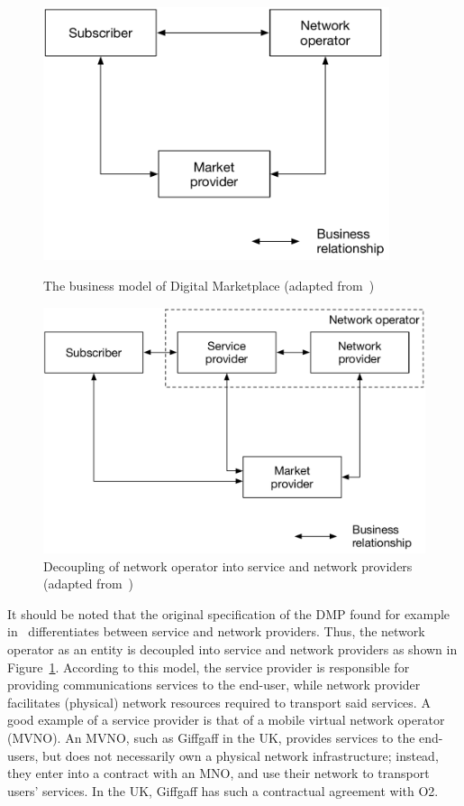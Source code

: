 \begin{figure}[p]
	\includegraphics[width=4in]{DMP/Figures/dmp_model}
	\caption{The business model of Digital Marketplace (adapted from~\cite{DMIrvine02})}
	\label{fig:dmp_model_dmp}
	\vspace{10mm}
	\includegraphics[width=5in]{DMP/Figures/no_decoupled}
	\caption{Decoupling of network operator into service and network providers (adapted from~\cite{DMIrvine02})}
	\label{fig:no_decoupled_dmp}
\end{figure}

It should be noted that the original specification of the DMP found for example in~\cite{DMLeBodic00,DMIrvine02,LeBodicThesis} differentiates between service and network providers. Thus, the network operator as an entity is decoupled into service and network providers as shown in Figure~\ref{fig:no_decoupled_dmp}. According to this model, the service provider is responsible for providing communications services to the end-user, while network provider facilitates (physical) network resources required to transport said services. A good example of a service provider is that of a mobile virtual network operator (MVNO). An MVNO, such as Giffgaff in the UK, provides services to the end-users, but does not necessarily own a physical network infrastructure; instead, they enter into a contract with an MNO, and use their network to transport users' services. In the UK, Giffgaff has such a contractual agreement with O2.

